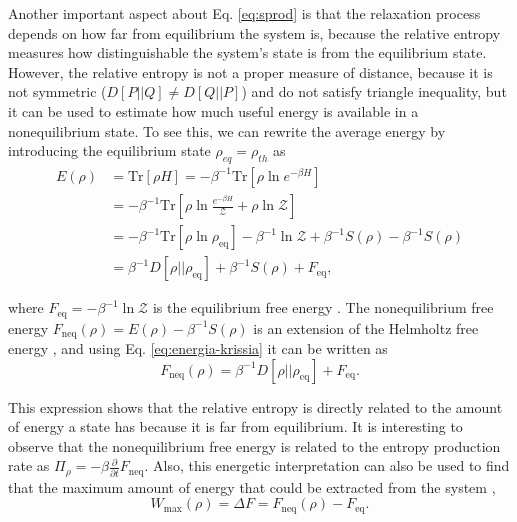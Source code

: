 Another important aspect about Eq. \eqref{eq:sprod} is that the relaxation process depends on how far from equilibrium the system is, because the relative entropy measures how distinguishable the system's state is from the equilibrium state. However, the relative entropy is not a proper measure of distance, because it is not symmetric ($D[P||Q] \neq D[Q||P]$) and do not satisfy triangle inequality, but it can be used to estimate how much useful energy is available in a nonequilibrium state. To see this, we can rewrite the average energy by introducing the equilibrium state $\rho_{eq} = \rho_{th}$ as
\begin{equation}
    \begin{split}
        E({\rho}) &= \text{Tr}[{\rho} {H}] = -\beta^{-1} \text{Tr}[{\rho} \ln e^{-\beta {H}}]\\
        &= -\beta^{-1} \text{Tr}\left[{\rho} \ln \frac{e^{-\beta {H}}}{\mathcal{Z}} + {\rho} \ln \mathcal{Z} \right]\\
        &= -\beta^{-1} \text{Tr}\left[{\rho} \ln \rho_{\text{eq}} \right] -\beta^{-1} \ln \mathcal{Z} + \beta^{-1} S({\rho}) - \beta^{-1} S({\rho})\\
        &= \beta^{-1} D[{\rho} || \rho_{\text{eq}}] + \beta^{-1} S({\rho}) + F_{\text{eq}},
    \end{split}
    \label{eq:energia-krissia}
\end{equation}

\noindent where $F_{\text{eq}} = -\beta^{-1} \ln \mathcal{Z}$ is the equilibrium free energy \cite{krissia-2024}. The nonequilibrium free energy $F_{\text{neq}}(\rho) = E(\rho) - \beta^{-1} S(\rho)$ is an extension of the Helmholtz free energy \cite{parrondo-2015}, and using Eq. \eqref{eq:energia-krissia} it can be written as
\begin{equation}
    F_{\text{neq}} (\rho) = \beta^{-1} D[{\rho} || \rho_{\text{eq}}] + F_{\text{eq}}.
    \label{eq:fneq}
\end{equation}

\noindent This expression shows that the relative entropy is directly related to the amount of energy a state has because it is far from equilibrium. It is interesting to observe that the nonequilibrium free energy is related to the entropy production rate as $\Pi_\rho = -\beta \frac{\partial}{\partial t} F_{\text{neq}}$. Also, this energetic interpretation can also be used to find that the maximum amount of energy that could be extracted from the system \cite{allahverdyan-2004, parrondo-2015, parrondo-2024},
\begin{equation}
    W_{\text{max}}(\rho) = \Delta F = F_{\text{neq}} (\rho) - F_{\text{eq}}.
\end{equation}

